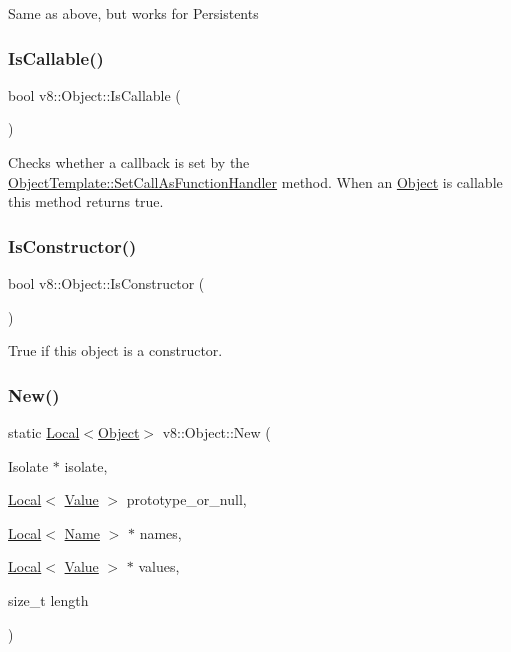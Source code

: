 Same as above, but works for Persistents \mbox{\label{classv8_1_1Object_a23c2c1f23b50fab4a02e2f819641b865}} 
\subsubsection{\texorpdfstring{Is\+Callable()}{IsCallable()}}
{\footnotesize\ttfamily bool v8\+::\+Object\+::\+Is\+Callable (\begin{DoxyParamCaption}{ }\end{DoxyParamCaption})}

Checks whether a callback is set by the \mbox{\hyperlink{classv8_1_1ObjectTemplate_a1775c8f73e643c339804d2f5b628eddf}{Object\+Template\+::\+Set\+Call\+As\+Function\+Handler}} method. When an \mbox{\hyperlink{classv8_1_1Object}{Object}} is callable this method returns true. \mbox{\label{classv8_1_1Object_a257233cb6b11dc7bb5a0e8df8695e889}} 
\subsubsection{\texorpdfstring{Is\+Constructor()}{IsConstructor()}}
{\footnotesize\ttfamily bool v8\+::\+Object\+::\+Is\+Constructor (\begin{DoxyParamCaption}{ }\end{DoxyParamCaption})}

True if this object is a constructor. \mbox{\label{classv8_1_1Object_a91733478a00a8d80d109531d2f741569}} 
\subsubsection{\texorpdfstring{New()}{New()}}
{\footnotesize\ttfamily static \mbox{\hyperlink{classv8_1_1Local}{Local}}$<$\mbox{\hyperlink{classv8_1_1Object}{Object}}$>$ v8\+::\+Object\+::\+New (\begin{DoxyParamCaption}\item[{Isolate $\ast$}]{isolate,  }\item[{\mbox{\hyperlink{classv8_1_1Local}{Local}}$<$ \mbox{\hyperlink{classv8_1_1Value}{Value}} $>$}]{prototype\+\_\+or\+\_\+null,  }\item[{\mbox{\hyperlink{classv8_1_1Local}{Local}}$<$ \mbox{\hyperlink{classv8_1_1Name}{Name}} $>$ $\ast$}]{names,  }\item[{\mbox{\hyperlink{classv8_1_1Local}{Local}}$<$ \mbox{\hyperlink{classv8_1_1Value}{Value}} $>$ $\ast$}]{values,  }\item[{size\+\_\+t}]{length }\end{DoxyParamCaption})\hspace{0.3cm}{\ttfamily [static]}}

